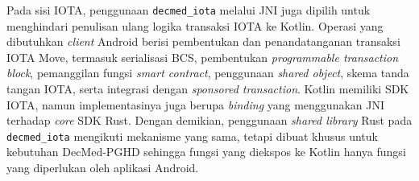 Pada sisi IOTA, penggunaan \texttt{decmed\_iota} melalui JNI juga dipilih untuk menghindari penulisan ulang logika transaksi IOTA ke Kotlin.
Operasi yang dibutuhkan \textit{client} Android berisi pembentukan dan penandatanganan transaksi IOTA Move, termasuk serialisasi BCS, pembentukan \textit{programmable transaction block}, pemanggilan fungsi \textit{smart contract}, penggunaan \textit{shared object}, skema tanda tangan IOTA, serta integrasi dengan \textit{sponsored transaction}.
Kotlin memiliki SDK IOTA, namun implementasinya juga berupa \textit{binding} yang menggunakan JNI terhadap \textit{core} SDK Rust.
Dengan demikian, penggunaan \textit{shared library} Rust pada \texttt{decmed\_iota} mengikuti mekanisme yang sama, tetapi dibuat khusus untuk kebutuhan DecMed-PGHD sehingga fungsi yang diekspos ke Kotlin hanya fungsi yang diperlukan oleh aplikasi Android.



